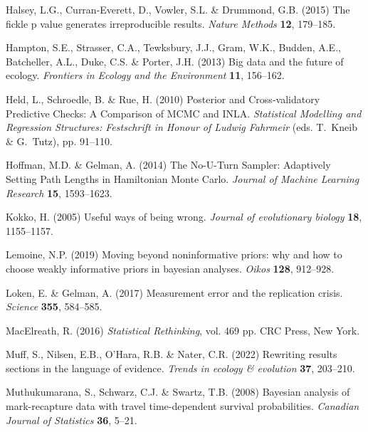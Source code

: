 \documentclass[11pt]{article}
\begin{document}
\begin{thebibliography}{35}
Halsey, L.G., Curran-Everett, D., Vowler, S.L. \& Drummond, G.B. (2015) The
  fickle p value generates irreproducible results. \emph{Nature Methods}
  \textbf{12}, 179--185.

Hampton, S.E., Strasser, C.A., Tewksbury, J.J., Gram, W.K., Budden, A.E.,
  Batcheller, A.L., Duke, C.S. \& Porter, J.H. (2013) Big data and the future
  of ecology. \emph{Frontiers in Ecology and the Environment} \textbf{11},
  156--162.

Held, L., Schroedle, B. \& Rue, H. (2010) {Posterior and Cross-validatory
  Predictive Checks: A Comparison of MCMC and INLA}. \emph{Statistical
  Modelling and Regression Structures: Festschrift in Honour of Ludwig
  Fahrmeir} (eds. T.~Kneib \& G.~Tutz), pp. 91--110.

Hoffman, M.D. \& Gelman, A. (2014) {The No-U-Turn Sampler: Adaptively Setting
  Path Lengths in Hamiltonian Monte Carlo}. \emph{Journal of Machine Learning
  Research} \textbf{15}, 1593--1623.

Kokko, H. (2005) Useful ways of being wrong. \emph{Journal of evolutionary
  biology} \textbf{18}, 1155--1157.

Lemoine, N.P. (2019) Moving beyond noninformative priors: why and how to choose
  weakly informative priors in bayesian analyses. \emph{Oikos} \textbf{128},
  912--928.

Loken, E. \& Gelman, A. (2017) Measurement error and the replication crisis.
  \emph{Science} \textbf{355}, 584--585.

MacElreath, R. (2016) \emph{Statistical Rethinking}, vol. 469 pp. CRC Press,
  New York.

Muff, S., Nilsen, E.B., O'Hara, R.B. \& Nater, C.R. (2022) Rewriting results
  sections in the language of evidence. \emph{Trends in ecology \& evolution}
  \textbf{37}, 203--210.

Muthukumarana, S., Schwarz, C.J. \& Swartz, T.B. (2008) Bayesian analysis of
  mark-recapture data with travel time-dependent survival probabilities.
  \emph{Canadian Journal of Statistics} \textbf{36}, 5--21.


\end{thebibliography}
\end{document}
